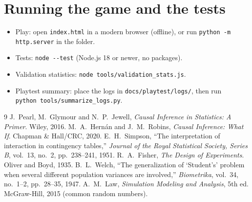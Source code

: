 \documentclass[11pt,a4paper]{article}
\begin{document}
\appendix
\section{Running the game and the tests}
\begin{itemize}
  \item Play: open \texttt{index.html} in a modern browser (offline), or run \texttt{python -m http.server} in the folder.
  \item Tests: \texttt{node -{}-test} (Node.js 18 or newer, no packages).
  \item Validation statistics: \texttt{node tools/validation\_stats.js}.
  \item Playtest summary: place the logs in \texttt{docs/playtest/logs/}, then run\\ \texttt{python tools/summarize\_logs.py}.
\end{itemize}

\begin{thebibliography}{9}
 J.~Pearl, M.~Glymour and N.~P.~Jewell, \emph{Causal Inference in Statistics: A Primer}. Wiley, 2016.
 M.~A.~Hern\'an and J.~M.~Robins, \emph{Causal Inference: What If}. Chapman \& Hall/CRC, 2020.
 E.~H.~Simpson, ``The interpretation of interaction in contingency tables,'' \emph{Journal of the Royal Statistical Society, Series B}, vol.~13, no.~2, pp.~238--241, 1951.
 R.~A.~Fisher, \emph{The Design of Experiments}. Oliver and Boyd, 1935.
 B.~L.~Welch, ``The generalization of `Student's' problem when several different population variances are involved,'' \emph{Biometrika}, vol.~34, no.~1--2, pp.~28--35, 1947.
 A.~M.~Law, \emph{Simulation Modeling and Analysis}, 5th ed. McGraw-Hill, 2015 (common random numbers).
\end{thebibliography}
\end{document}
